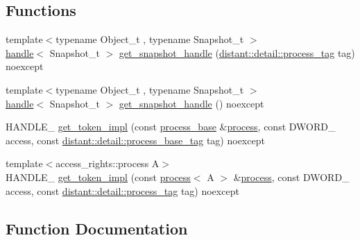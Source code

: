 \subsection*{Functions}
\begin{DoxyCompactItemize}
\item 
{\footnotesize template$<$typename Object\+\_\+t , typename Snapshot\+\_\+t $>$ }\\\mbox{\hyperlink{classdistant_1_1handle}{handle}}$<$ Snapshot\+\_\+t $>$ \mbox{\hyperlink{namespacedistant_1_1kernel__objects_1_1detail_a355ef80ed500ed51d451f0ee588d4a9d}{get\+\_\+snapshot\+\_\+handle}} (\mbox{\hyperlink{classdistant_1_1detail_1_1process__tag}{distant\+::detail\+::process\+\_\+tag}} tag) noexcept
\item 
{\footnotesize template$<$typename Object\+\_\+t , typename Snapshot\+\_\+t $>$ }\\\mbox{\hyperlink{classdistant_1_1handle}{handle}}$<$ Snapshot\+\_\+t $>$ \mbox{\hyperlink{namespacedistant_1_1kernel__objects_1_1detail_a749224a62b84dba47977dd0087d73d22}{get\+\_\+snapshot\+\_\+handle}} () noexcept
\item 
H\+A\+N\+D\+L\+E\+\_\+ \mbox{\hyperlink{namespacedistant_1_1kernel__objects_1_1detail_a719a0407ee6297eb94064f8e046d05c7}{get\+\_\+token\+\_\+impl}} (const \mbox{\hyperlink{classdistant_1_1kernel__objects_1_1process__base}{process\+\_\+base}} \&\mbox{\hyperlink{classdistant_1_1kernel__objects_1_1process}{process}}, const D\+W\+O\+R\+D\+\_\+ access, const \mbox{\hyperlink{classdistant_1_1detail_1_1process__base__tag}{distant\+::detail\+::process\+\_\+base\+\_\+tag}} tag) noexcept
\item 
{\footnotesize template$<$access\+\_\+rights\+::process A$>$ }\\H\+A\+N\+D\+L\+E\+\_\+ \mbox{\hyperlink{namespacedistant_1_1kernel__objects_1_1detail_af72f187b82462d74361d8602c799f779}{get\+\_\+token\+\_\+impl}} (const \mbox{\hyperlink{classdistant_1_1kernel__objects_1_1process}{process}}$<$ A $>$ \&\mbox{\hyperlink{classdistant_1_1kernel__objects_1_1process}{process}}, const D\+W\+O\+R\+D\+\_\+ access, const \mbox{\hyperlink{classdistant_1_1detail_1_1process__tag}{distant\+::detail\+::process\+\_\+tag}} tag) noexcept
\end{DoxyCompactItemize}


\subsection{Function Documentation}
\mbox{\label{namespacedistant_1_1kernel__objects_1_1detail_a355ef80ed500ed51d451f0ee588d4a9d}} 

